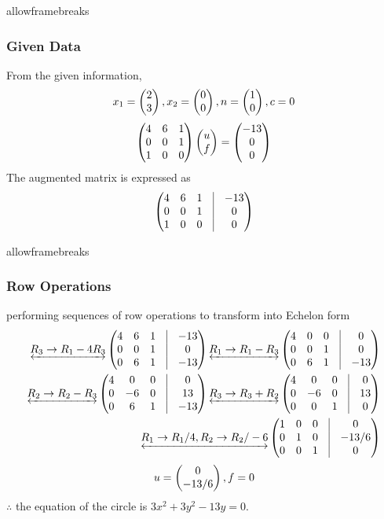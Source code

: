 \documentclass{beamer}
\begin{document}
\begin{frame}{allowframebreaks}
\frametitle{Given Data}
From the given information,
\begin{align}
	x_1=\begin{pmatrix}2\\3\end{pmatrix}, x_2=\begin{pmatrix}0\\0\end{pmatrix},n=\begin{pmatrix}1\\0\end{pmatrix},c=0 
\end{align}
\begin{align}
    \begin{pmatrix}4 & 6 & 1 \\
               0 & 0 & 1 \\
               1 & 0 & 0\end{pmatrix}
               \begin{pmatrix}u\\f\end{pmatrix}=\begin{pmatrix}-13\\0\\0\end{pmatrix}
\end{align}
The augmented matrix is expressed as
	\begin{align}
        \myvec{4 & 6 & 1 & \vrule & -13\\
         0 &  0 & 1 & \vrule & 0\\                                                 
         1 &  0 & 0 & \vrule & 0}       
\end{align}
\end{frame}
\begin{frame}{allowframebreaks}
\frametitle{Row Operations}
performing sequences of row operations to transform into Echelon form
\begin{align}
	\underleftrightarrow{R_3 \rightarrow R_1-4R_3}
         \myvec{4 & 6 & 1 & \vrule & -13\\
         0 &  0 & 1 & \vrule & 0\\
         0 &  6 & 1 & \vrule & -13}
         \underleftrightarrow{R_1\rightarrow R_1-R_3}
         \myvec{4 & 0 & 0 & \vrule & 0\\
         0 & 0 & 1 & \vrule & 0\\
         0 & 6 & 1 &\vrule & -13}\\
         \underleftrightarrow{R_2\rightarrow R_2-R_3}
         \myvec{4 & 0 & 0 &\vrule & 0\\
         0 & -6 & 0 & \vrule & 13 \\
         0 & 6 & 1 & \vrule & -13}
         \underleftrightarrow{R_3\rightarrow R_3+R_2}
         \myvec{4 & 0 & 0 &\vrule & 0\\
         0 & -6 & 0 & \vrule & 13 \\
         0 & 0 & 1 & \vrule & 0}\\
         \underleftrightarrow{R_1\rightarrow R_1/4, R_2 \rightarrow R_2/-6}
\myvec{1 & 0 & 0 &\vrule & 0\\
         0 & 1 & 0 & \vrule & -13/6 \\
         0 & 0 & 1 & \vrule & 0} 
\end{align}
\begin{align}
   u=\begin{pmatrix}0 \\ -13/6\end{pmatrix},f=0
\end{align}
$\therefore$ the equation of the circle is $3x^2+3y^2-13y=0$.
\end{frame}
\end{document}
